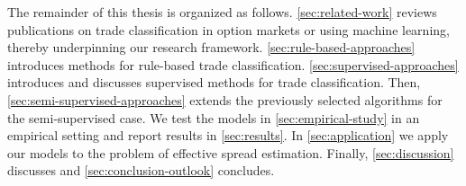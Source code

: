 
The remainder of this thesis is organized as follows. \cref{sec:related-work} reviews publications on trade classification in option markets or using machine learning, thereby underpinning our research framework. \cref{sec:rule-based-approaches} introduces methods for rule-based trade classification. \cref{sec:supervised-approaches} introduces and discusses supervised methods for trade classification. Then, \cref{sec:semi-supervised-approaches} extends the previously selected algorithms for the semi-supervised case. We test the models in \cref{sec:empirical-study} in an empirical setting and report results in \cref{sec:results}. In \cref{sec:application} we apply our models to the problem of effective spread estimation. Finally, \cref{sec:discussion} discusses and \cref{sec:conclusion-outlook} concludes.
